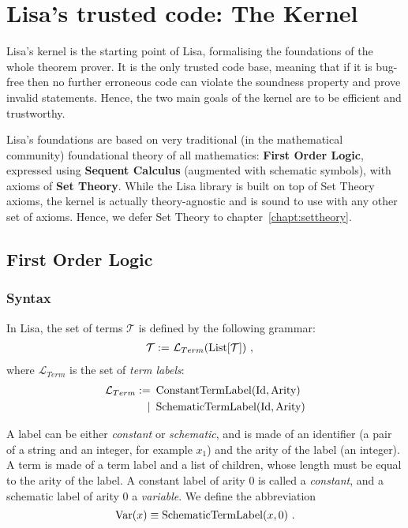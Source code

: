 \chapter{Lisa's trusted code: The Kernel}
\label{chapt:kernel}
Lisa's kernel is the starting point of Lisa, formalising the foundations of the whole theorem prover. It is the only trusted code base, meaning that if it is bug-free then no further erroneous code can violate the soundness property and prove invalid statements. Hence, the two main goals of the kernel are to be efficient and trustworthy.


Lisa's foundations are based on very traditional (in the mathematical community) foundational theory of all mathematics: \textbf{First Order Logic}, expressed using \textbf{Sequent Calculus} (augmented with schematic symbols), with axioms of \textbf{Set Theory}.
While the Lisa library is built on top of Set Theory axioms, the kernel is actually theory-agnostic and is sound to use with any other set of axioms. Hence, we defer Set Theory to chapter~\ref{chapt:settheory}.

\section{First Order Logic}
\label{sec:FOL}
\subsection{Syntax}
\begin{definition}[Terms]
  In Lisa, the set of terms $\mathcal{T}$ is defined by the following grammar:
  \begin{align}
    \mathcal{T} := & ~\mathcal{L}_{Term}(\operatorname{List}[\mathcal{T}])~,
  \end{align}
  where $\mathcal{L}_{Term}$ is the set of \textit{term labels}:
  \begin{align}
    \mathcal{L}_{Term} := & ~\operatorname{ConstantTermLabel}(\textnormal{Id}, \textnormal{Arity})  \\
    \mid                  & ~\operatorname{SchematicTermLabel}(\textnormal{Id}, \textnormal{Arity})
  \end{align}

  A label can be either \textit{constant} or \textit{schematic}, and is made of an identifier (a pair of a string and an integer, for example $x_1$) and the arity of the label (an integer).
  A term is made of a term label and a list of children, whose length must be equal to the arity of the label.
  A constant label of arity $0$ is called a \emph{constant}, and a schematic label of arity $0$ a \emph{variable}.
  We define the abbreviation
  $$
    \operatorname{Var}(x) \equiv \operatorname{SchematicTermLabel}(x, 0)~.
  $$
\end{definition}

